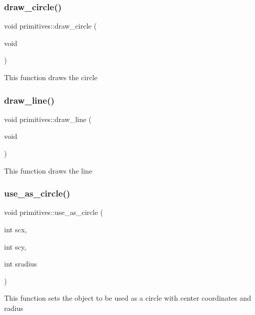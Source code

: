 \subsubsection{\texorpdfstring{draw\+\_\+circle()}{draw\_circle()}}
{\footnotesize\ttfamily void primitives\+::draw\+\_\+circle (\begin{DoxyParamCaption}\item[{void}]{ }\end{DoxyParamCaption})}

This function draws the circle \mbox{\label{classprimitives_a0884f9ffa84019993dbeed357fe853c6}} 
\subsubsection{\texorpdfstring{draw\+\_\+line()}{draw\_line()}}
{\footnotesize\ttfamily void primitives\+::draw\+\_\+line (\begin{DoxyParamCaption}\item[{void}]{ }\end{DoxyParamCaption})}

This function draws the line \mbox{\label{classprimitives_a564d6b5f62f0958ed7773fdddd8ae05c}} 
\subsubsection{\texorpdfstring{use\+\_\+as\+\_\+circle()}{use\_as\_circle()}}
{\footnotesize\ttfamily void primitives\+::use\+\_\+as\+\_\+circle (\begin{DoxyParamCaption}\item[{int}]{scx,  }\item[{int}]{scy,  }\item[{int}]{sradius }\end{DoxyParamCaption})}

This function sets the object to be used as a circle with center coordinates and radius \mbox{\label{classprimitives_af30707ef8153f3770400b1b1126cae79}} 
